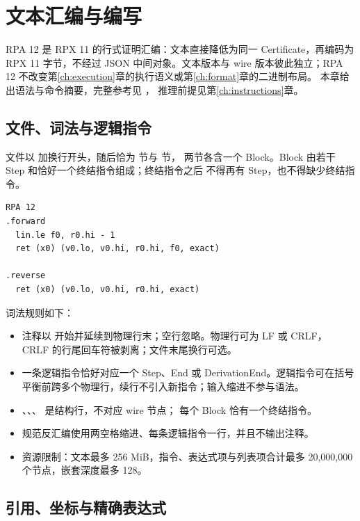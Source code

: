 \chapter{文本汇编与编写}
\label{ch:assembly}

RPA 12 是 RPX 11 的行式证明汇编：文本直接降低为同一 Certificate，再编码为
RPX 11 字节，不经过 JSON 中间对象。文本版本与 wire 版本彼此独立；RPA 12
不改变第\ref{ch:execution}章的执行语义或第\ref{ch:format}章的二进制布局。
本章给出语法与命令摘要，完整参考见 ，
推理前提见第\ref{ch:instructions}章。

\section{文件、词法与逻辑指令}
\label{sec:rpa-lexical}

文件以  加换行开头，随后恰为  节与  节，
两节各含一个 Block。Block 由若干 Step 和恰好一个终结指令组成；终结指令之后
不得再有 Step，也不得缺少终结指令。

\begin{lstlisting}
RPA 12
.forward
  lin.le f0, r0.hi - 1
  ret (x0) (v0.lo, v0.hi, r0.hi, f0, exact)

.reverse
  ret (x0) (v0.lo, v0.hi, r0.hi, exact)
\end{lstlisting}

词法规则如下：
\begin{itemize}
\item 注释以 \code{;} 开始并延续到物理行末；空行忽略。物理行可为 LF 或 CRLF，
      CRLF 的行尾回车符被剥离；文件末尾换行可选。
\item 一条逻辑指令恰好对应一个 Step、End 或 DerivationEnd。逻辑指令可在括号
      平衡前跨多个物理行，续行不引入新指令；输入缩进不参与语法。
\item {}、、、 是结构行，不对应 wire 节点；
      每个 Block 恰有一个终结指令。
\item 规范反汇编使用两空格缩进、每条逻辑指令一行，并且不输出注释。
\item 资源限制：文本最多 256 MiB，指令、表达式项与列表项合计最多
      20,000,000 个节点，嵌套深度最多 128。
\end{itemize}

\section{引用、坐标与精确表达式}
\label{sec:rpa-scalars}

